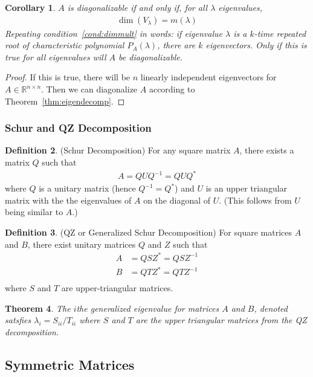 \documentclass[12pt]{article}
\numberwithin{equation}{section} %
\theoremstyle{plain}
\newtheorem{thm}{Theorem}[section]
\newtheorem{cor}[thm]{Corollary}
\theoremstyle{definition}
\newtheorem{defn}[thm]{Definition}
\theoremstyle{remark}
\newcommand{\Rnn}{\mathbb{R}^{n\times n}}
\begin{document}
\begin{cor}
$A$ is diagonalizable if and only if, for all $\lambda$ eigenvalues,
\begin{align}
  \label{cond:dimmult}
  \dim(V_\lambda)=m(\lambda)
\end{align}
Repeating condition~\ref{cond:dimmult} in words: if eigenvalue $\lambda$
is a $k$-time repeated root of characteristic polynomial $P_A(\lambda)$,
there are $k$ eigenvectors. Only if this is true for all eigenvalues
will $A$ be diagonalizable.
\end{cor}
\begin{proof}
If this is true, there will be $n$ linearly independent eigenvectors for
$A\in \Rnn$. Then we can diagonalize $A$ according to
Theorem~\ref{thm:eigendecomp}.
\end{proof}


\subsubsection{Schur and QZ Decomposition}

\begin{defn}{(Schur Decomposition)}
For any square matrix $A$, there exists a matrix $Q$ such that
\begin{align*}
  A = Q U Q^{-1} = Q U Q^*
\end{align*}
where $Q$ is a unitary matrix (hence $Q^{-1} = Q^*$) and $U$ is an upper
triangular matrix with the the eigenvalues of $A$ on the diagonal of
$U$. (This follows from $U$ being similar to $A$.)
\end{defn}

\begin{defn}{(QZ or Generalized Schur Decomposition)}
For square matrices $A$ and $B$, there exist unitary matrices $Q$ and
$Z$ such that
\begin{align*}
  A &= Q S Z^* = QSZ^{-1} \\
  B &= Q T Z^* = QTZ^{-1} \\
\end{align*}
where $S$ and $T$ are upper-triangular matrices.
\end{defn}

\begin{thm}
The $i$the generalized eigenvalue for matrices $A$ and $B$, denoted
satsfies $\lambda_i = S_{ii} / T_{ii}$ where $S$ and $T$ are the upper
triangular matrices from the QZ decomposition.
\end{thm}


\subsection{Symmetric Matrices}
\end{document}
